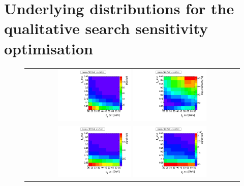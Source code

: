 \clearpage
\chapter{Underlying distributions for the qualitative search sensitivity optimisation}
\label{app:OptimisationApp}

\begin{figure}[!h]
  \centering 
  \begin{tabular}{c}
    \includegraphics[width=0.35\textwidth]{figures/analysis/Optimisation/BkgYield_ECaloLe5.pdf} 
    \includegraphics[width=0.35\textwidth]{figures/analysis/Optimisation/BkgUncertainty_ECaloLe5.pdf}\\ 
    \includegraphics[width=0.35\textwidth]{figures/analysis/Optimisation/Madgraph_signal_mass_100_ctau_5cm_ECaloLe5_SignalYield.pdf}
    \includegraphics[width=0.35\textwidth]{figures/analysis/Optimisation/Madgraph_signal_mass_100_ctau_50cm_ECaloLe5_SignalYield.pdf}\\ 

\end{tabular}
\end{figure}

